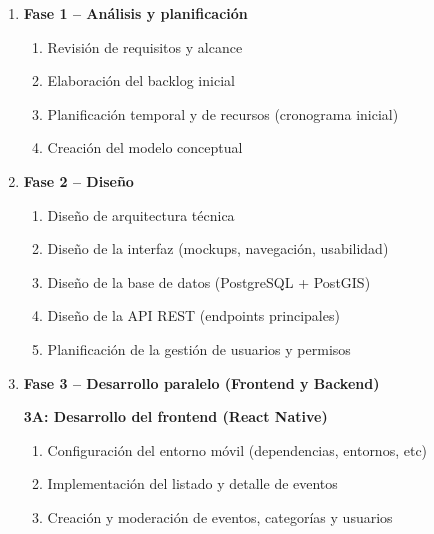 \documentclass[12pt]{article}
\begin{document}
\begin{enumerate}

\item \textbf{Fase 1 – Análisis y planificación}

\begin{enumerate}

\item Revisión de requisitos y alcance

\item Elaboración del backlog inicial

\item Planificación temporal y de recursos (cronograma inicial)

\item Creación del modelo conceptual

\end{enumerate}

\item \textbf{Fase 2 – Diseño}

\begin{enumerate}

\item Diseño de arquitectura técnica

\item Diseño de la interfaz (mockups, navegación, usabilidad)

\item Diseño de la base de datos (PostgreSQL + PostGIS)

\item Diseño de la API REST (endpoints principales)

\item Planificación de la gestión de usuarios y permisos

\end{enumerate}

\item \textbf{Fase 3 – Desarrollo paralelo (Frontend y Backend)}

\textbf{3A: Desarrollo del frontend (React Native)}

\begin{enumerate}

\item Configuración del entorno móvil (dependencias, entornos, etc)

\item Implementación del listado y detalle de eventos

\item Creación y moderación de eventos, categorías y usuarios


\end{enumerate}
\end{enumerate}
\end{document}
